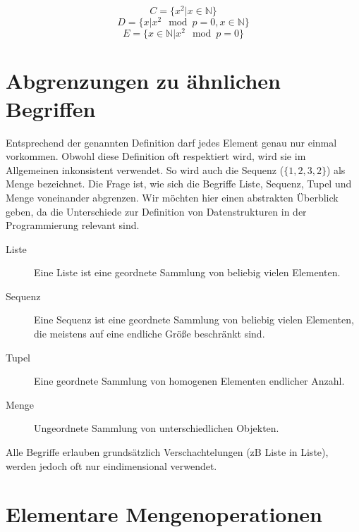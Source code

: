\[
    C = \{x^2 | x \in \mathbb{N}\}
\] \[
    D = \{x | x^2 \mod{p} = 0, x \in \mathbb{N}\}
\] \[
    E = \{x \in \mathbb{N} | x^2 \mod{p} = 0\}
\]

\section{Abgrenzungen zu ähnlichen Begriffen}
%
Entsprechend der genannten Definition darf jedes Element genau nur einmal vorkommen. Obwohl diese Definition oft respektiert wird, wird sie im Allgemeinen inkonsistent verwendet. So wird auch die Sequenz ($\{1, 2, 3, 2\}$) als Menge bezeichnet. Die Frage ist, wie sich die Begriffe Liste, Sequenz, Tupel und Menge voneinander abgrenzen. Wir möchten hier einen abstrakten Überblick geben, da die Unterschiede zur Definition von Datenstrukturen in der Programmierung relevant sind.
%
\begin{description}
 \item[Liste] Eine Liste ist eine geordnete Sammlung von beliebig vielen Elementen.
 \item[Sequenz] Eine Sequenz ist eine geordnete Sammlung von beliebig vielen Elementen,
                die meistens auf eine endliche Größe beschränkt sind.
 \item[Tupel] Eine geordnete Sammlung von homogenen Elementen endlicher Anzahl.
 \item[Menge] Ungeordnete Sammlung von unterschiedlichen Objekten.
\end{description}

Alle Begriffe erlauben grundsätzlich Verschachtelungen (zB Liste in Liste),
werden jedoch oft nur eindimensional verwendet.

\section{Elementare Mengenoperationen}
%
